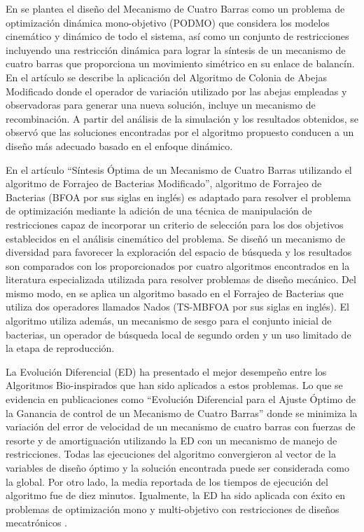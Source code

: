  En \cite{portilla-flores_dynamic_nodate} se plantea el diseño del Mecanismo de Cuatro Barras como un problema de optimización dinámica mono-objetivo (PODMO) que considera los modelos cinemático y dinámico de todo el sistema, así como un conjunto de restricciones incluyendo una restricción dinámica para lograr la síntesis de un mecanismo de cuatro barras que proporciona un movimiento simétrico en su enlace de balancín. En el artículo se describe la aplicación del Algoritmo de Colonia de Abejas Modificado donde el operador de variación utilizado por las abejas empleadas y observadoras para generar una nueva solución, incluye un mecanismo de recombinación. A partir del análisis de la simulación y los resultados obtenidos, se observó que las soluciones encontradas por el algoritmo propuesto conducen a un diseño más adecuado basado en el enfoque dinámico.


En el artículo ``Síntesis Óptima de un Mecanismo de Cuatro Barras utilizando el algoritmo de Forrajeo de Bacterias Modificado'', algoritmo de Forrajeo de Bacterias (BFOA por sus siglas en inglés) es adaptado para resolver el problema de optimización mediante la adición de una técnica de manipulación de restricciones capaz de incorporar un criterio de selección para los dos objetivos establecidos en el análisis cinemático del problema. Se diseñó un mecanismo de diversidad para favorecer la exploración del espacio de búsqueda y los resultados son comparados con los proporcionados por cuatro algoritmos encontrados en la literatura especializada utilizada para resolver problemas de diseño mecánico\cite{mezura-montes_optimum_2014}. Del mismo modo, en \cite{herne1_two_swim_2016} se aplica un algoritmo basado en el Forrajeo de Bacterias que utiliza dos operadores llamados Nados (TS-MBFOA por sus siglas en inglés). El algoritmo utiliza además, un mecanismo de sesgo para el conjunto inicial de bacterias, un operador de búsqueda local de segundo orden y un uso limitado de la etapa de reproducción.
  
La Evolución Diferencial (ED) ha presentado el mejor desempeño entre los Algoritmos Bio-inspirados que han sido aplicados a estos problemas. Lo que se evidencia en publicaciones como ``Evolución Diferencial para el Ajuste Óptimo de la Ganancia de control de un Mecanismo de Cuatro Barras'' donde se minimiza la variación del error de velocidad de un mecanismo de cuatro barras con fuerzas de resorte y de amortiguación utilizando la ED con un mecanismo de manejo de restricciones. Todas las ejecuciones del algoritmo convergieron al vector de la variables de diseño óptimo y la solución encontrada puede ser considerada como la global. Por otro lado, la media reportada de los tiempos de ejecución  del algoritmo fue de diez minutos. Igualmente, la ED ha sido aplicada con éxito en problemas de optimización mono y multi-objetivo con restricciones de diseños mecatrónicos \cite{portilla-flores_integration_2007} \cite{villarreal-cervantes_control_2013}.
  

